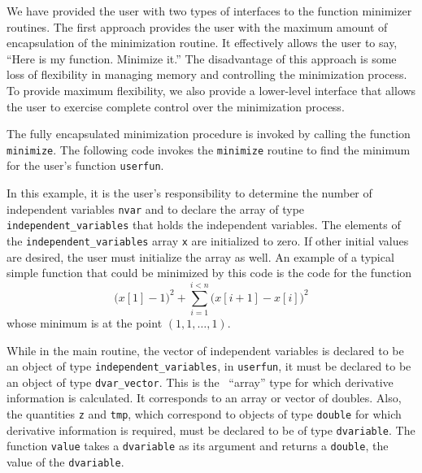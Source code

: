 \documentclass{admbmanual}
\begin{document}
We have provided the user
with two types of interfaces to the function minimizer routines. The first approach provides the user with the maximum amount of encapsulation of the
minimization routine. It effectively allows the user to say, ``Here is my
function. Minimize it.'' The disadvantage of this approach is some loss of
flexibility in managing memory and controlling the minimization
process. To provide maximum flexibility, we also provide a lower-level interface
that allows the user to exercise complete control over the minimization 
process.

The fully encapsulated minimization procedure is invoked by calling the
function \texttt{minimize}. 
The following code invokes the \texttt{minimize} routine
to find the minimum for the user's function \texttt{userfun}.


In this example, it is the user's responsibility to determine the
number of independent variables \texttt{nvar} and to declare the array
of type \texttt{independent\_variables} that holds the independent variables.
 The elements of the
\texttt{independent\_variables} array \texttt{x} are initialized to zero.  If
other initial values are desired, the user must initialize the
array as well. An example of a typical simple function that could
be minimized by this code is the code for the function
\begin{equation*}
  \big(x[1]-1\big)^2 + \sum_{i=1}^{i<n} \Big(x[i+1]-x[i]\Big)^2
\end{equation*}
whose minimum is at the point $(1,1,\ldots,1)$.


While in the main routine, the vector of independent variables is declared
to be an object of type \texttt{independent\_variables}, in \texttt{userfun}, it must be declared to be an object of type \texttt{dvar\_vector}. This is the \scAD\  ``array'' type for which
derivative 
information is calculated. It corresponds to an array or vector
of doubles. Also, the quantities \texttt{z} and \texttt{tmp}, which correspond to
objects of type \texttt{double} for which derivative information is required,
must be declared to be of type \texttt{dvariable}. The function \texttt{value}
takes a \texttt{dvariable} as its argument and returns a \texttt{double},
the value of the \texttt{dvariable}.
\end{document}
